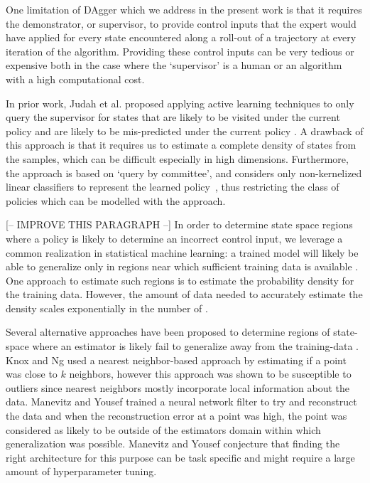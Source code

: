 \documentclass[10pt, conference]{ieeeconf}      %
\begin{document}
One limitation of DAgger which we address in the present work is that it requires the demonstrator, or supervisor, to
provide control inputs that the expert would have applied for every state encountered along a roll-out of a trajectory
at every iteration of the algorithm. Providing these control inputs can be very tedious or expensive both in the case
where the `supervisor' is a human or an algorithm with a high computational cost.

In prior work, Judah et al. proposed applying active learning techniques to only query the supervisor for states that
are likely to be visited under the current policy and are likely to be mis-predicted under the current policy
\cite{judah2011active,judah2012active}. A drawback of this approach is that it requires us to estimate a complete
density of states from the samples, which can be difficult especially in high dimensions. Furthermore, the approach is
based on `query by committee', and considers only non-kernelized linear classifiers to represent the learned
policy~\cite{gilad2005query}, thus restricting the class of policies which can be modelled with the approach.

{\color{blue}[-- IMPROVE THIS PARAGRAPH --]} 
In order to determine state space regions where a policy is likely to determine an incorrect control input, we leverage
a common realization in statistical machine learning: a trained model will likely be able to generalize only in 
regions near which sufficient training data is available \cite{tokdar2010importance}. 
One approach to estimate such regions is to estimate the probability density for the training data. However, the amount of data needed
to accurately estimate the density scales exponentially in the number of \cite{nadaraya1964estimating}.

Several alternative approaches have been proposed to determine regions of state-space where an estimator is likely fail
to generalize away from the training-data \cite{markou2003novelty}. Knox and Ng \cite{knox1998algorithms} used a nearest
neighbor-based approach by estimating if a point was close to $k$ neighbors, however this approach was shown to be
susceptible to outliers since nearest neighbors mostly incorporate local information about the data. Manevitz and Yousef
\cite{manevitz2002one} trained a neural network filter to try and reconstruct the data and when the reconstruction error
at a point was high, the point was considered as likely to be outside of the estimators domain within which
generalization was possible. Manevitz and Yousef conjecture that finding the right architecture for this purpose can be task specific
and might require a large amount of hyperparameter tuning.
\end{document}
